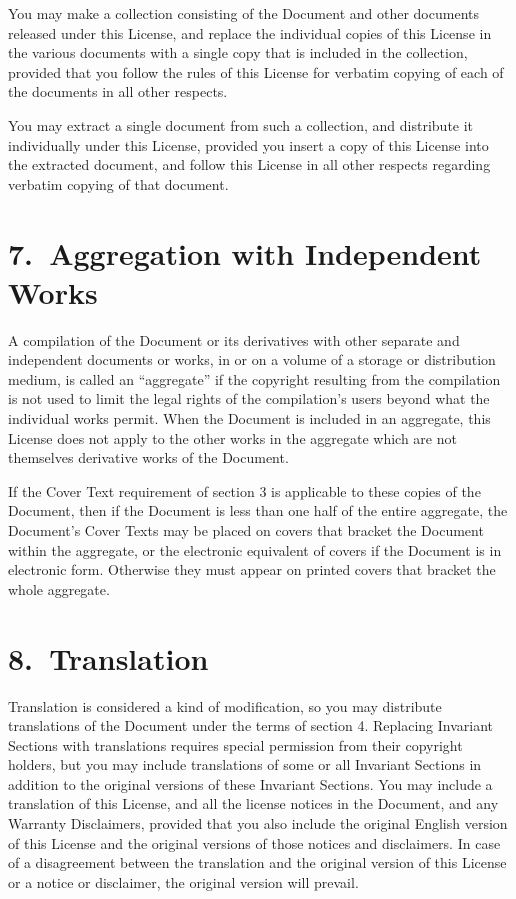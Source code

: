 You may make a collection consisting of the Document and other
documents released under this License, and replace the individual
copies of this License in the various documents with a single copy
that is included in the collection, provided that you follow the rules
of this License for verbatim copying of each of the documents in all
other respects.

You may extract a single document from such a collection, and
distribute it individually under this License, provided you insert a
copy of this License into the extracted document, and follow this
License in all other respects regarding verbatim copying of that
document.



\section*{7.\ Aggregation with Independent Works}

A compilation of the Document or its derivatives with other separate
and independent documents or works, in or on a volume of a storage or
distribution medium, is called an ``aggregate'' if the copyright
resulting from the compilation is not used to limit the legal rights
of the compilation's users beyond what the individual works permit.
When the Document is included in an aggregate, this License does not
apply to the other works in the aggregate which are not themselves
derivative works of the Document.

If the Cover Text requirement of section 3 is applicable to these
copies of the Document, then if the Document is less than one half of
the entire aggregate, the Document's Cover Texts may be placed on
covers that bracket the Document within the aggregate, or the
electronic equivalent of covers if the Document is in electronic form.
Otherwise they must appear on printed covers that bracket the whole
aggregate.



\section*{8.\ Translation}

Translation is considered a kind of modification, so you may
distribute translations of the Document under the terms of section 4.
Replacing Invariant Sections with translations requires special
permission from their copyright holders, but you may include
translations of some or all Invariant Sections in addition to the
original versions of these Invariant Sections. You may include a
translation of this License, and all the license notices in the
Document, and any Warranty Disclaimers, provided that you also include
the original English version of this License and the original versions
of those notices and disclaimers. In case of a disagreement between
the translation and the original version of this License or a notice
or disclaimer, the original version will prevail.

